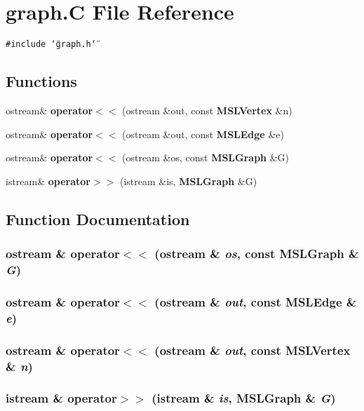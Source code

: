 \section{graph.C File Reference}
\label{graph_8C}
{\tt \#include \char`\"{}graph.h\char`\"{}}\par
\subsection*{Functions}
\begin{CompactItemize}
\item 
ostream\& {\bf operator$<$$<$} (ostream \&out, const {\bf MSLVertex} \&n)
\item 
ostream\& {\bf operator$<$$<$} (ostream \&out, const {\bf MSLEdge} \&e)
\item 
ostream\& {\bf operator$<$$<$} (ostream \&os, const {\bf MSLGraph} \&G)
\item 
istream\& {\bf operator$>$$>$} (istream \&is, {\bf MSLGraph} \&G)
\end{CompactItemize}


\subsection{Function Documentation}
\subsubsection{\setlength{\rightskip}{0pt plus 5cm}ostream \& operator$<$$<$ (ostream \& {\em os}, const {\bf MSLGraph} \& {\em G})}\label{graph_8C_a2}


\subsubsection{\setlength{\rightskip}{0pt plus 5cm}ostream \& operator$<$$<$ (ostream \& {\em out}, const {\bf MSLEdge} \& {\em e})}\label{graph_8C_a1}


\subsubsection{\setlength{\rightskip}{0pt plus 5cm}ostream \& operator$<$$<$ (ostream \& {\em out}, const {\bf MSLVertex} \& {\em n})}\label{graph_8C_a0}


\subsubsection{\setlength{\rightskip}{0pt plus 5cm}istream \& operator$>$$>$ (istream \& {\em is}, {\bf MSLGraph} \& {\em G})}\label{graph_8C_a3}


